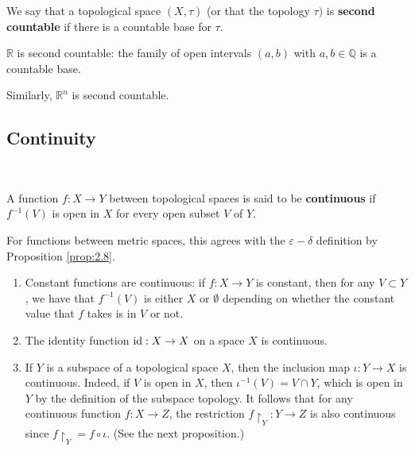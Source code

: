 \documentclass[a4paper]{article}
\begin{document}
\begin{definition}
    We say that a topological space $(X, \tau)$ (or that the topology $\tau)$ is \textbf{second countable} if there is a countable base for $\tau$.
\end{definition}
\begin{example}
    $\mathbb{R}$ is second countable: the family of open intervals $(a, b)$ with $a, b \in \mathbb{Q}$ is a countable base.

Similarly, $\mathbb{R}^{n}$ is second countable.

\end{example}

\subsection{Continuity}\ \vspace{-1.5em}
\begin{definition}
    A function $f: X \rightarrow Y$ between topological spaces is said to be \textbf{continuous} if $f^{-1}(V)$ is open in $X$ for every open subset $V$ of $Y$.
\end{definition}
\begin{note}
    For functions between metric spaces, this agrees with the $\varepsilon-\delta$ definition by Proposition \ref{prop:2.8}.
\end{note}

\begin{example}
    \begin{enumerate}
        \item Constant functions are continuous: if $f: X \rightarrow Y$ is constant, then for any $V \subset Y$, we have that $f^{-1}(V)$ is either $X$ or $\emptyset$ depending on whether the constant value that $f$ takes is in $V$ or not.
      
        \item The identity function $\operatorname{id}: X \rightarrow X$ on a space $X$ is continuous.
      
        \item If $Y$ is a subspace of a topological space $X$, then the inclusion map $\iota: Y \rightarrow X$ is continuous. Indeed, if $V$ is open in $X$, then $\iota^{-1}(V)=V \cap Y$, which is open in $Y$ by the definition of the subspace topology. It follows that for any continuous function $f: X \rightarrow Z$, the restriction $f\restriction_{Y}: Y \rightarrow Z$ is also continuous since $f\restriction_{Y}=f \circ \iota$. (See the next proposition.)
      
      \end{enumerate}
\end{example}
\end{document}
